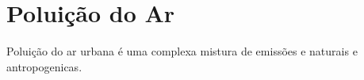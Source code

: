 \section{Poluição do Ar}

Poluição do ar urbana é uma complexa mistura de emissões e naturais e 
antropogenicas.  
